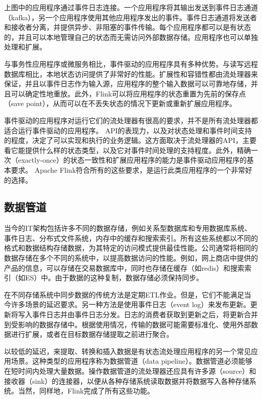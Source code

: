 \documentclass[cn,11pt,chinese]{elegantbook}
\begin{document}
上图中的应用程序通过事件日志连接。一个应用程序将其输出发送到事件日志通道（kafka），另一个应用程序使用其他应用程序发出的事件。事件日志通道将发送者和接收者分离，并提供异步、非阻塞的事件传输。每个应用程序都可以是有状态的，并且可以本地管理自己的状态而无需访问外部数据存储。应用程序也可以单独处理和扩展。

与事务性应用程序或微服务相比，事件驱动的应用程序具有多种优势。与读写远程数据库相比，本地状态访问提供了非常好的性能。扩展性和容错性都由流处理器来保证，并且以事件日志作为输入源，应用程序的整个输入数据可以可靠地存储，并且可以确定性地重放。此外，Flink可以将应用程序的状态重置为先前的保存点（save point），从而可以在不丢失状态的情况下更新或重新扩展应用程序。

事件驱动的应用程序对运行它们的流处理器有很高的要求，并不是所有流处理器都适合运行事件驱动的应用程序。 API的表现力，以及对状态处理和事件时间支持的程度，决定了可以实现和执行的业务逻辑。这方面取决于流处理器的API，主要看它能提供什么样的状态类型，以及它对事件时间处理的支持程度。此外，精确一次（exactly-once）的状态一致性和扩展应用程序的能力是事件驱动应用程序的基本要求。 Apache Flink符合所有的这些要求，是运行此类应用程序的一个非常好的选择。

\subsection{数据管道}

当今的IT架构包括许多不同的数据存储，例如关系型数据库和专用数据库系统、事件日志、分布式文件系统，内存中的缓存和搜索索引。所有这些系统都以不同的格式和数据结构存储数据，为其特定的访问模式提供最佳性能。公司通常将相同的数据存储在多个不同的系统中，以提高数据访问的性能。例如，网上商店中提供的产品的信息，可以存储在交易数据库中，同时也存储在缓存（如redis）和搜索索引（如ES）中。由于数据的这种复制，数据存储必须保持同步。

在不同存储系统中同步数据的传统方法是定期ETL作业。但是，它们不能满足当今许多场景的延迟要求。另一种方法是使用事件日志（event log）来发布更新。更新将写入事件日志并由事件日志分发。日志的消费者获取到更新之后，将更新合并到受影响的数据存储中。根据使用情况，传输的数据可能需要标准化、使用外部数据进行扩展，或者在目标数据存储提取之前进行聚合。

以较低的延迟，来提取、转换和插入数据是有状态流处理应用程序的另一个常见应用场景。这种类型的应用程序称为数据管道（data pipeline）。数据管道必须能够在短时间内处理大量数据。操作数据管道的流处理器还应具有许多源（source）和接收器（sink）的连接器，以便从各种存储系统读取数据并将数据写入各种存储系统。当然，同样地，Flink完成了所有这些功能。
\end{document}
